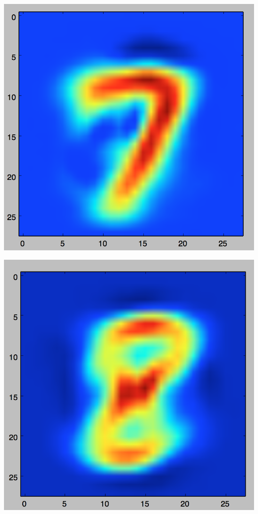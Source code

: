 \documentclass[11pt]{article}
\begin{document}
\includegraphics[scale=.3]{images/bayes7.png}

\includegraphics[scale=.3]{images/bayes8.png}
\end{document}
